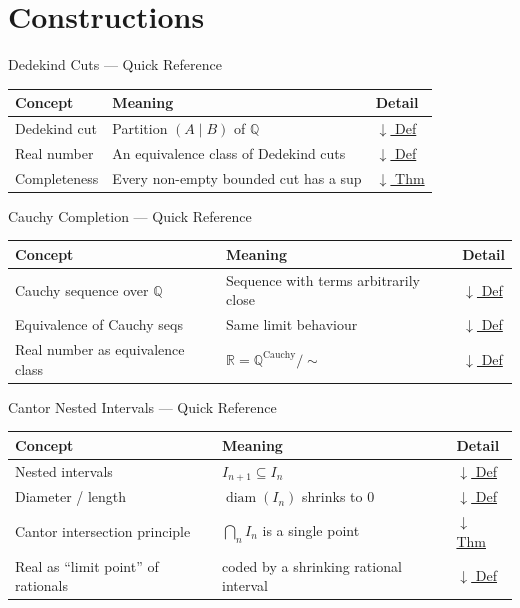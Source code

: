 \section{Constructions}

\begin{toolkitbox}{Dedekind Cuts --- Quick Reference}
\small
\begin{tabular}{l l l}
\toprule
\textbf{Concept} & \textbf{Meaning} & \textbf{Detail} \\
\midrule
Dedekind cut  & Partition $(A \mid B)$ of $\mathbb{Q}$ & \hyperref[def:dedekind-cut]{$\downarrow$ Def} \\
Real number   & An equivalence class of Dedekind cuts & \hyperref[def:real-as-cut]{$\downarrow$ Def} \\
Completeness  & Every non-empty bounded cut has a sup & \hyperref[thm:dedekind-complete]{$\downarrow$ Thm} \\
\bottomrule
\end{tabular}
\end{toolkitbox}

\begin{toolkitbox}{Cauchy Completion --- Quick Reference}
\small
\begin{tabular}{l l l}
\toprule
\textbf{Concept} & \textbf{Meaning} & \textbf{Detail} \\
\midrule
Cauchy sequence over $\mathbb{Q}$ & Sequence with terms arbitrarily close & \hyperref[def:cauchy-q]{$\downarrow$ Def} \\
Equivalence of Cauchy seqs        & Same limit behaviour & \hyperref[def:cauchy-equiv]{$\downarrow$ Def} \\
Real number as equivalence class  & $\mathbb{R} = \mathbb{Q}^{\text{Cauchy}} / {\sim}$ & \hyperref[def:real-as-cauchy]{$\downarrow$ Def} \\
\bottomrule
\end{tabular}
\end{toolkitbox}

\begin{toolkitbox}{Cantor Nested Intervals --- Quick Reference}
\small
\begin{tabular}{l l l}
\toprule
\textbf{Concept} & \textbf{Meaning} & \textbf{Detail} \\
\midrule
Nested intervals & $I_{n+1}\subseteq I_n$ & \hyperref[def:nested-intervals]{$\downarrow$ Def} \\
Diameter / length & $\operatorname{diam}(I_n)$ shrinks to $0$ & \hyperref[def:diameter]{$\downarrow$ Def} \\
Cantor intersection principle & $\bigcap_n I_n$ is a single point & \hyperref[thm:cantor-nested]{$\downarrow$ Thm} \\
Real as ``limit point'' of rationals & coded by a shrinking rational interval & \hyperref[def:real-as-nested]{$\downarrow$ Def} \\
\bottomrule
\end{tabular}
\end{toolkitbox}

